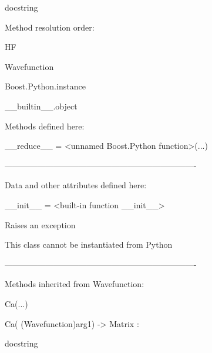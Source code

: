 \documentclass[letterpaper,10pt,english]{sphinxmanual}
\begin{document}
\begin{description}
\begin{description}
\item[{class HF(Wavefunction)}] \leavevmode
\begin{DUlineblock}{0em}
\item[] docstring
\item[] 
\item[] Method resolution order:
\item[]
\begin{DUlineblock}{\DUlineblockindent}
\item[] HF
\item[] Wavefunction
\item[] Boost.Python.instance
\item[] \_\_builtin\_\_.object
\item[] 
\end{DUlineblock}
\item[] Methods defined here:
\item[] 
\item[] \_\_reduce\_\_ = \textless{}unnamed Boost.Python function\textgreater{}(...)
\item[] 
\item[] ----------------------------------------------------------------------
\item[] Data and other attributes defined here:
\item[] 
\item[] \_\_init\_\_ = \textless{}built-in function \_\_init\_\_\textgreater{}
\item[]
\begin{DUlineblock}{\DUlineblockindent}
\item[] Raises an exception
\item[] This class cannot be instantiated from Python
\item[] 
\end{DUlineblock}
\item[] ----------------------------------------------------------------------
\item[] Methods inherited from Wavefunction:
\item[] 
\item[] Ca(...)
\item[]
\begin{DUlineblock}{\DUlineblockindent}
\item[] Ca( (Wavefunction)arg1) -\textgreater{} Matrix :
\item[]
\begin{DUlineblock}{\DUlineblockindent}
\item[] docstring

\end{DUlineblock}
\end{DUlineblock}
\end{DUlineblock}
\end{description}
\end{description}
\end{document}
